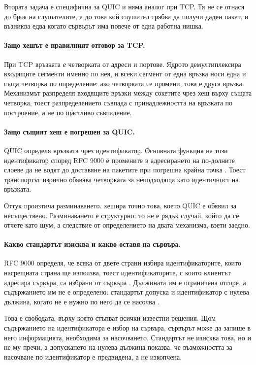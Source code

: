 Втората задача е специфична за QUIC и няма аналог при TCP. Тя не се отнася до броя на
слушателите, а до това кой слушател трябва да получи даден пакет, и възниква едва когато
сървърът има повече от една работна нишка.

\paragraph{Защо хешът е правилният отговор за TCP.} При TCP връзката \emph{е} четворката от
адреси и портове. Ядрото демултиплексира входящите сегменти именно по нея, и всеки сегмент от
една връзка носи една и съща четворка по определение: ако четворката се промени, това е друга
връзка. Механизмът  разпределя входящите връзки между сокетите чрез хеш
върху същата четворка, тоест разпределението съвпада с принадлежността на връзката по
построение, а не по щастливо съвпадение.

\paragraph{Защо същият хеш е погрешен за QUIC.} QUIC определя връзката чрез идентификатор.
Основната функция на този идентификатор според RFC 9000 е промените в адресирането на
по-долните слоеве да не водят до доставяне на пакетите при погрешна крайна точка
\cite{rfc9000}. Тоест транспортът изрично обявява четворката за неподходяща като идентичност
на връзката.

Оттук произтича разминаването.  хешира точно това, което QUIC е обявил за
несъществено. Разминаването е структурно: то не е рядък случай, който да се отчете като шум,
а следствие от определението на двата механизма, взети заедно.

\paragraph{Какво стандартът изисква и какво оставя на сървъра.} RFC 9000 определя, че всяка от
двете страни избира идентификаторите, които насрещната страна ще използва, тоест
идентификаторите, с които клиентът адресира сървъра, са избрани от сървъра \cite{rfc9000}.
Дължината им е ограничена отгоре, а съдържанието им не е определено: стандартът допуска и
идентификатор с нулева дължина, когато не е нужно по него да се насочва \cite{rfc9000}.

Това е свободата, върху която стъпват всички известни решения. Щом съдържанието на
идентификатора е избор на сървъра, сървърът може да запише в него информацията, необходима за
насочването. Стандартът не изисква това, но и не му пречи, а допускането на нулева дължина
показва, че възможността за насочване по идентификатор е предвидена, а не изкопчена.

